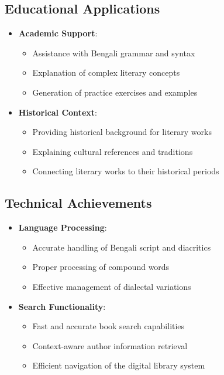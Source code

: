 \subsection{Educational Applications}
\begin{itemize}
    \item \textbf{Academic Support}:
    \begin{itemize}
        \item Assistance with Bengali grammar and syntax
        \item Explanation of complex literary concepts
        \item Generation of practice exercises and examples
    \end{itemize}
    
    \item \textbf{Historical Context}:
    \begin{itemize}
        \item Providing historical background for literary works
        \item Explaining cultural references and traditions
        \item Connecting literary works to their historical periods
    \end{itemize}
\end{itemize}

\subsection{Technical Achievements}
\begin{itemize}
    \item \textbf{Language Processing}:
    \begin{itemize}
        \item Accurate handling of Bengali script and diacritics
        \item Proper processing of compound words
        \item Effective management of dialectal variations
    \end{itemize}
    
    \item \textbf{Search Functionality}:
    \begin{itemize}
        \item Fast and accurate book search capabilities
        \item Context-aware author information retrieval
        \item Efficient navigation of the digital library system
    \end{itemize}
\end{itemize}

